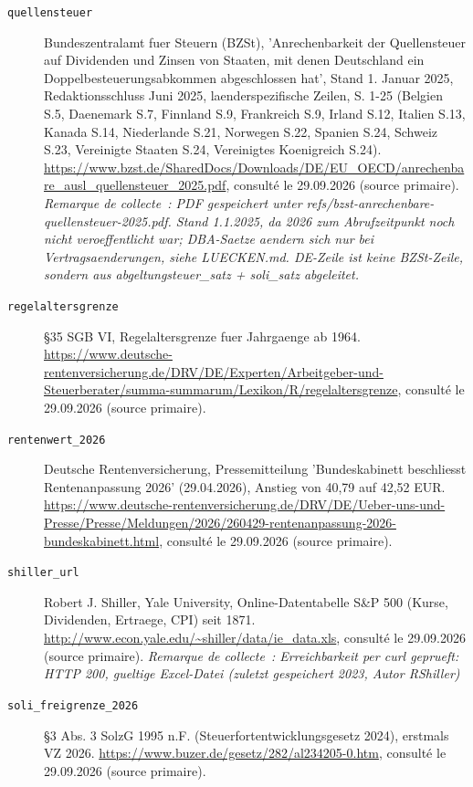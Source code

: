 \begin{description}
\item[\texttt{quellensteuer}] \label{src:quellensteuer} Bundeszentralamt fuer Steuern (BZSt), 'Anrechenbarkeit der Quellensteuer auf Dividenden und Zinsen von Staaten, mit denen Deutschland ein Doppelbesteuerungsabkommen abgeschlossen hat', Stand 1. Januar 2025, Redaktionsschluss Juni 2025, laenderspezifische Zeilen, S. 1-25 (Belgien S.5, Daenemark S.7, Finnland S.9, Frankreich S.9, Irland S.12, Italien S.13, Kanada S.14, Niederlande S.21, Norwegen S.22, Spanien S.24, Schweiz S.23, Vereinigte Staaten S.24, Vereinigtes Koenigreich S.24). \url{https://www.bzst.de/SharedDocs/Downloads/DE/EU_OECD/anrechenbare_ausl_quellensteuer_2025.pdf}, consulté le 29.09.2026 (source primaire). \textit{Remarque de collecte~: PDF gespeichert unter refs/bzst-anrechenbare-quellensteuer-2025.pdf. Stand 1.1.2025, da 2026 zum Abrufzeitpunkt noch nicht veroeffentlicht war; DBA-Saetze aendern sich nur bei Vertragsaenderungen, siehe LUECKEN.md. DE-Zeile ist keine BZSt-Zeile, sondern aus abgeltungsteuer\_satz + soli\_satz abgeleitet.}
\item[\texttt{regelaltersgrenze}] \label{src:regelaltersgrenze} §35 SGB VI, Regelaltersgrenze fuer Jahrgaenge ab 1964. \url{https://www.deutsche-rentenversicherung.de/DRV/DE/Experten/Arbeitgeber-und-Steuerberater/summa-summarum/Lexikon/R/regelaltersgrenze}, consulté le 29.09.2026 (source primaire).
\item[\texttt{rentenwert\_2026}] \label{src:rentenwert_2026} Deutsche Rentenversicherung, Pressemitteilung 'Bundeskabinett beschliesst Rentenanpassung 2026' (29.04.2026), Anstieg von 40,79 auf 42,52 EUR. \url{https://www.deutsche-rentenversicherung.de/DRV/DE/Ueber-uns-und-Presse/Presse/Meldungen/2026/260429-rentenanpassung-2026-bundeskabinett.html}, consulté le 29.09.2026 (source primaire).
\item[\texttt{shiller\_url}] \label{src:shiller_url} Robert J. Shiller, Yale University, Online-Datentabelle S\&P 500 (Kurse, Dividenden, Ertraege, CPI) seit 1871. \url{http://www.econ.yale.edu/~shiller/data/ie_data.xls}, consulté le 29.09.2026 (source primaire). \textit{Remarque de collecte~: Erreichbarkeit per curl geprueft: HTTP 200, gueltige Excel-Datei (zuletzt gespeichert 2023, Autor RShiller)}
\item[\texttt{soli\_freigrenze\_2026}] \label{src:soli_freigrenze_2026} §3 Abs. 3 SolzG 1995 n.F. (Steuerfortentwicklungsgesetz 2024), erstmals VZ 2026. \url{https://www.buzer.de/gesetz/282/al234205-0.htm}, consulté le 29.09.2026 (source primaire).

\end{description}
